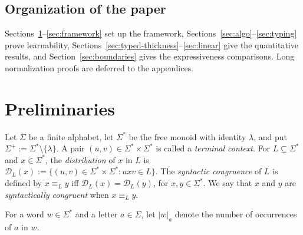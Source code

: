 \documentclass[11pt,a4paper]{article}
\theoremstyle{remark}
\theoremstyle{plain}
\newcommand{\D}{\mathcal{D}}
\begin{document}
\subsection{Organization of the paper}
Sections~\ref{sec:prelim}--\ref{sec:framework} set up the framework,
Sections~\ref{sec:algo}--\ref{sec:typing} prove learnability,
Sections~\ref{sec:typed-thickness}--\ref{sec:linear} give the quantitative
results, and Section~\ref{sec:boundaries} gives the expressiveness
comparisons.  Long normalization proofs are deferred to the appendices.

\section{Preliminaries}
\label{sec:prelim}

Let $\Sigma$ be a finite alphabet, let $\Sigma^*$ be the free monoid with
identity $\lambda$, and put $\Sigma^+:=\Sigma^*\setminus\{\lambda\}$.
A pair $(u,v)\in\Sigma^*\times\Sigma^*$ is called a
\emph{terminal context}.  For $L\subseteq\Sigma^*$ and $x\in\Sigma^*$, the \emph{distribution} of $x$ in $L$ is
$\D_L(x):=\{(u,v)\in\Sigma^*\times\Sigma^*:uxv\in L\}$.
The \emph{syntactic congruence} of $L$ is defined by $x\equiv_L y$ iff
$\D_L(x)=\D_L(y)$, for $x,y\in\Sigma^*$.
We say that $x$ and $y$ are \emph{syntactically congruent} when
$x\equiv_L y$.

For a word $w\in\Sigma^*$ and a letter $a\in\Sigma$, let $|w|_a$ denote
the number of occurrences of $a$ in $w$.
\end{document}
